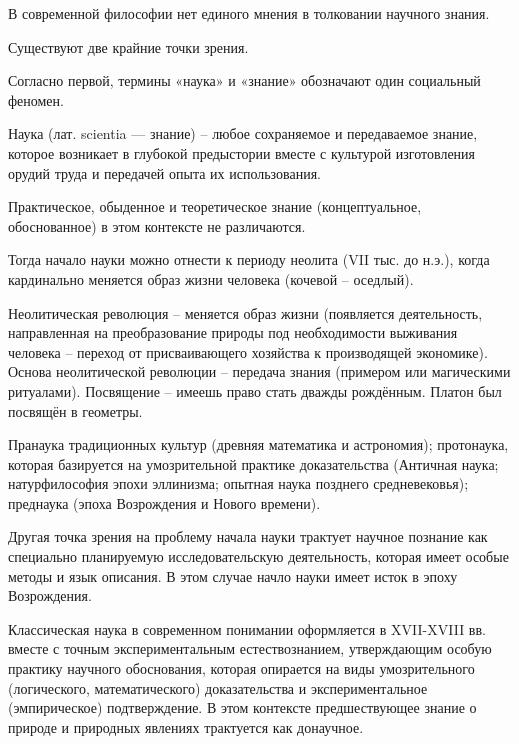 \documentclass[exam_answers.tex]{subfiles}
\begin{document}
\renewcommand{\baselinestretch}{\blch}

В современной философии нет единого мнения в толковании научного знания.

Существуют две крайние точки зрения.

Согласно первой, термины «наука» и «знание» обозначают один социальный феномен.

Наука (лат. scientia — знание) – любое сохраняемое и передаваемое знание, которое возникает в глубокой предыстории вместе с культурой изготовления орудий труда и передачей опыта их использования.

Практическое, обыденное и теоретическое знание (концептуальное, обоснованное) в этом контексте не различаются.

Тогда начало науки можно отнести к периоду неолита (VII тыс. до н.э.), когда кардинально меняется образ жизни человека (кочевой – оседлый).

Неолитическая революция – меняется образ жизни (появляется деятельность, направленная на преобразование природы под необходимости выживания человека – переход от присваивающего хозяйства к производящей экономике).
Основа неолитической революции – передача знания (примером или магическими ритуалами).
Посвящение – имеешь право стать дважды рождённым.
Платон был посвящён в геометры.

Пранаука традиционных культур (древняя математика и астрономия);
протонаука, которая базируется на умозрительной практике доказательства (Античная наука; натурфилософия эпохи эллинизма;
опытная наука позднего средневековья);
преднаука (эпоха Возрождения и Нового времени).

Другая точка зрения на проблему начала науки трактует научное познание как специально планируемую исследовательскую деятельность, которая имеет особые методы и язык описания.
В этом случае начло науки имеет исток в эпоху Возрождения.

Классическая наука в современном понимании оформляется в XVII-XVIII вв. вместе с точным экспериментальным естествознанием, утверждающим особую практику научного обоснования, которая опирается на виды умозрительного (логического, математического) доказательства и экспериментальное (эмпирическое) подтверждение.
В этом контексте предшествующее знание о природе и природных явлениях трактуется как донаучное.
\end{document}

